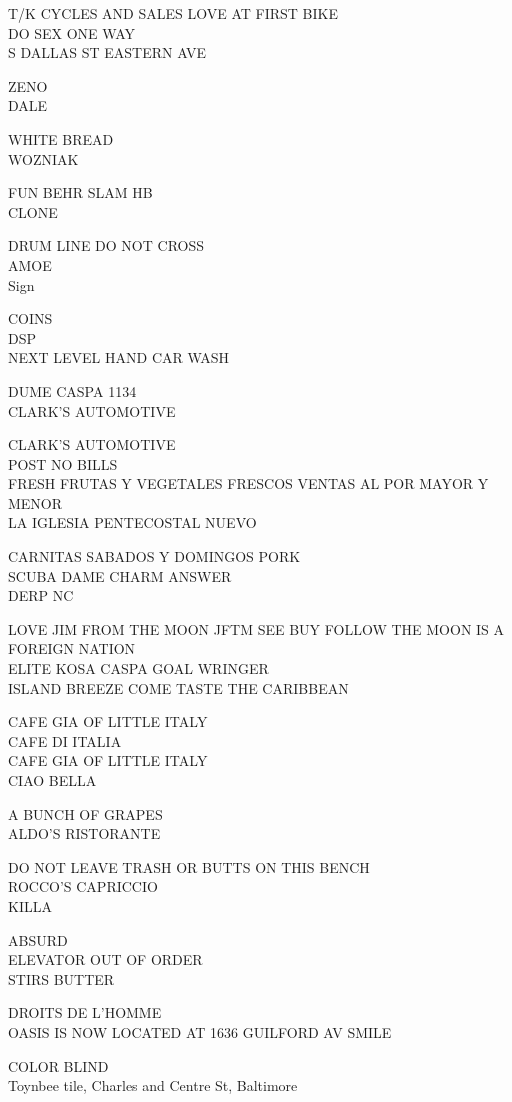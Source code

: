 \documentclass[10pt,letterpaper]{article}
\begin{document}
T/K CYCLES AND SALES LOVE AT FIRST BIKE\\
DO SEX ONE WAY\\
S DALLAS ST EASTERN AVE

ZENO\\
DALE

WHITE BREAD\\
WOZNIAK

FUN BEHR SLAM HB\\
CLONE

DRUM LINE DO NOT CROSS\\
AMOE\\
Sign

COINS\\
DSP\\
NEXT LEVEL HAND CAR WASH

DUME CASPA 1134\\
CLARK'S AUTOMOTIVE

CLARK'S AUTOMOTIVE\\
POST NO BILLS\\
FRESH FRUTAS Y VEGETALES FRESCOS VENTAS AL POR MAYOR Y MENOR\\
LA IGLESIA PENTECOSTAL NUEVO

CARNITAS SABADOS Y DOMINGOS PORK\\
SCUBA DAME CHARM ANSWER\\
DERP NC

LOVE JIM FROM THE MOON JFTM SEE BUY FOLLOW THE MOON IS A FOREIGN NATION\\
ELITE KOSA CASPA GOAL WRINGER\\
ISLAND BREEZE COME TASTE THE CARIBBEAN

CAFE GIA OF LITTLE ITALY\\
CAFE DI ITALIA\\
CAFE GIA OF LITTLE ITALY\\
CIAO BELLA

A BUNCH OF GRAPES\\
ALDO'S RISTORANTE

DO NOT LEAVE TRASH OR BUTTS ON THIS BENCH\\
ROCCO'S CAPRICCIO\\
KILLA

ABSURD\\
ELEVATOR OUT OF ORDER\\
STIRS BUTTER

DROITS DE L'HOMME\\
OASIS IS NOW LOCATED AT 1636 GUILFORD AV SMILE

COLOR BLIND\\
Toynbee tile, Charles and Centre St, Baltimore
\end{document}
